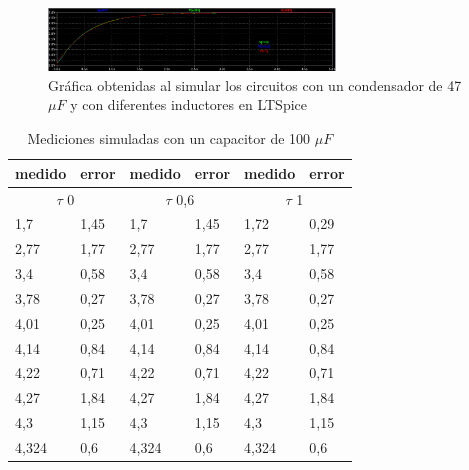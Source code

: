 \documentclass[journal]{IEEEtran}
\begin{document}
\begin{figure}
	\centering
	\includegraphics[width=3in]{img/simulacion47.png}
	\caption{Gráfica obtenidas al simular los circuitos con un condensador de 47 \(\mu F\) y con diferentes inductores en LTSpice}
	\label{fig:sim47}
\end{figure}
\begin{table}[]
	\centering
	\caption{Mediciones simuladas con un capacitor de 100 \(\mu F\)}
	\label{simulado100}
	\begin{tabular}{|l|l|l|l|l|l|}
		\hline
		medido          & error          & medido           & error          & medido          & error         \\ \hline
		\multicolumn{2}{|c|}{\(\tau\) 0} & \multicolumn{2}{c|}{\(\tau\) 0,6} & \multicolumn{2}{c|}{\(\tau\) 1} \\ \hline
		1,7             & 1,45           & 1,7              & 1,45           & 1,72             & 0,29          \\ \hline
		2,77            & 1,77           & 2,77             & 1,77           & 2,77            & 1,77          \\ \hline
		3,4             & 0,58           & 3,4              & 0,58           & 3,4             & 0,58          \\ \hline
		3,78            & 0,27           & 3,78             & 0,27           & 3,78            & 0,27          \\ \hline
		4,01            & 0,25           & 4,01             & 0,25           & 4,01            & 0,25          \\ \hline
		4,14            & 0,84           & 4,14             & 0,84           & 4,14            & 0,84          \\ \hline
		4,22            & 0,71           & 4,22             & 0,71           & 4,22            & 0,71          \\ \hline
		4,27            & 1,84           & 4,27             & 1,84           & 4,27            & 1,84          \\ \hline
		4,3             & 1,15           & 4,3              & 1,15           & 4,3             & 1,15          \\ \hline
		4,324            & 0,6           & 4,324             & 0,6           & 4,324            & 0,6          \\ \hline
	\end{tabular}
\end{table}
\end{document}
